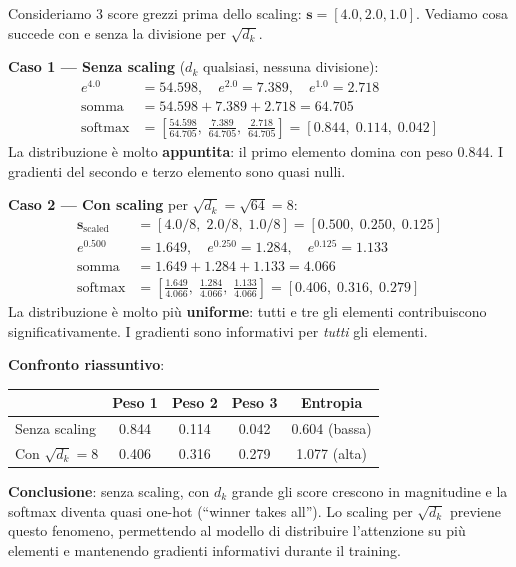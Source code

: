 \documentclass[12pt,a4paper]{article}
\begin{document}
\begin{examplebox}
Consideriamo 3 score grezzi prima dello scaling: $\mathbf{s} = [4.0, 2.0, 1.0]$. Vediamo cosa succede con e senza la divisione per $\sqrt{d_k}$.

\textbf{Caso 1 --- Senza scaling} ($d_k$ qualsiasi, nessuna divisione):
\begin{align*}
    e^{4.0} &= 54.598, \quad e^{2.0} = 7.389, \quad e^{1.0} = 2.718 \\
    \text{somma} &= 54.598 + 7.389 + 2.718 = 64.705 \\
    \text{softmax} &= \left[\frac{54.598}{64.705},\; \frac{7.389}{64.705},\; \frac{2.718}{64.705}\right] = [0.844,\; 0.114,\; 0.042]
\end{align*}
La distribuzione \`e molto \textbf{appuntita}: il primo elemento domina con peso $0.844$. I gradienti del secondo e terzo elemento sono quasi nulli.

\textbf{Caso 2 --- Con scaling} per $\sqrt{d_k} = \sqrt{64} = 8$:
\begin{align*}
    \mathbf{s}_{\text{scaled}} &= [4.0/8,\; 2.0/8,\; 1.0/8] = [0.500,\; 0.250,\; 0.125] \\
    e^{0.500} &= 1.649, \quad e^{0.250} = 1.284, \quad e^{0.125} = 1.133 \\
    \text{somma} &= 1.649 + 1.284 + 1.133 = 4.066 \\
    \text{softmax} &= \left[\frac{1.649}{4.066},\; \frac{1.284}{4.066},\; \frac{1.133}{4.066}\right] = [0.406,\; 0.316,\; 0.279]
\end{align*}
La distribuzione \`e molto pi\`u \textbf{uniforme}: tutti e tre gli elementi contribuiscono significativamente. I gradienti sono informativi per \emph{tutti} gli elementi.

\textbf{Confronto riassuntivo}:
\begin{center}
\begin{tabular}{@{}lcccc@{}}
\toprule
& Peso 1 & Peso 2 & Peso 3 & Entropia \\
\midrule
Senza scaling & 0.844 & 0.114 & 0.042 & 0.604 (bassa) \\
Con $\sqrt{d_k}{=}8$ & 0.406 & 0.316 & 0.279 & 1.077 (alta) \\
\bottomrule
\end{tabular}
\end{center}

\textbf{Conclusione}: senza scaling, con $d_k$ grande gli score crescono in magnitudine e la softmax diventa quasi one-hot (``winner takes all''). Lo scaling per $\sqrt{d_k}$ previene questo fenomeno, permettendo al modello di distribuire l'attenzione su pi\`u elementi e mantenendo gradienti informativi durante il training.
\end{examplebox}
\end{document}
